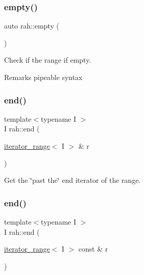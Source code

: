 \subsubsection{\texorpdfstring{empty()}{empty()}\hspace{0.1cm}{\footnotesize\ttfamily [2/2]}}
{\footnotesize\ttfamily auto rah\+::empty (\begin{DoxyParamCaption}{ }\end{DoxyParamCaption})}



Check if the range if empty. 

\begin{DoxyRemark}{Remarks}
pipeable syntax
\end{DoxyRemark}

\begin{DoxyCodeInclude}{0}
\end{DoxyCodeInclude}
\mbox{\label{namespacerah_aaddd1442cd76b96876e692cdefe7261d}} 
\subsubsection{\texorpdfstring{end()}{end()}\hspace{0.1cm}{\footnotesize\ttfamily [1/2]}}
{\footnotesize\ttfamily template$<$typename I $>$ \\
I rah\+::end (\begin{DoxyParamCaption}\item[{\mbox{\hyperlink{structrah_1_1iterator__range}{iterator\+\_\+range}}$<$ I $>$ \&}]{r }\end{DoxyParamCaption})}



Get the \char`\"{}past the\char`\"{} end iterator of the range. 

\mbox{\label{namespacerah_a6b31fe80bf81abf3149df010cb265e20}} 
\subsubsection{\texorpdfstring{end()}{end()}\hspace{0.1cm}{\footnotesize\ttfamily [2/2]}}
{\footnotesize\ttfamily template$<$typename I $>$ \\
I rah\+::end (\begin{DoxyParamCaption}\item[{\mbox{\hyperlink{structrah_1_1iterator__range}{iterator\+\_\+range}}$<$ I $>$ const \&}]{r }\end{DoxyParamCaption})}



